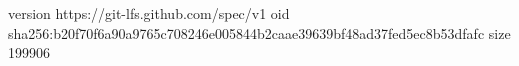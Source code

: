 version https://git-lfs.github.com/spec/v1
oid sha256:b20f70f6a90a9765c708246e005844b2caae39639bf48ad37fed5ec8b53dfafc
size 199906
